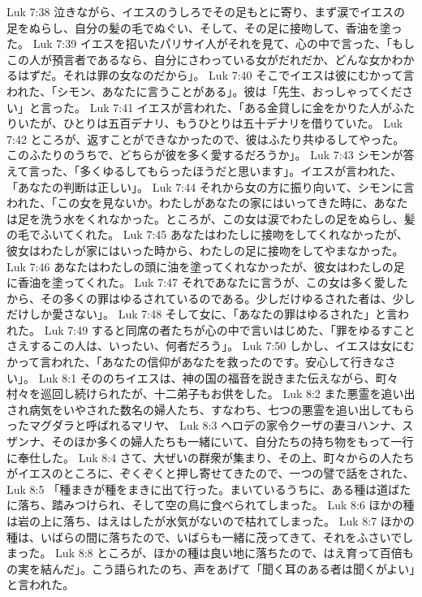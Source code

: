 Luk 7:38  泣きながら、イエスのうしろでその足もとに寄り、まず涙でイエスの足をぬらし、自分の髪の毛でぬぐい、そして、その足に接吻して、香油を塗った。
Luk 7:39  イエスを招いたパリサイ人がそれを見て、心の中で言った、「もしこの人が預言者であるなら、自分にさわっている女がだれだか、どんな女かわかるはずだ。それは罪の女なのだから」。
Luk 7:40  そこでイエスは彼にむかって言われた、「シモン、あなたに言うことがある」。彼は「先生、おっしゃってください」と言った。
Luk 7:41  イエスが言われた、「ある金貸しに金をかりた人がふたりいたが、ひとりは五百デナリ、もうひとりは五十デナリを借りていた。
Luk 7:42  ところが、返すことができなかったので、彼はふたり共ゆるしてやった。このふたりのうちで、どちらが彼を多く愛するだろうか」。
Luk 7:43  シモンが答えて言った、「多くゆるしてもらったほうだと思います」。イエスが言われた、「あなたの判断は正しい」。
Luk 7:44  それから女の方に振り向いて、シモンに言われた、「この女を見ないか。わたしがあなたの家にはいってきた時に、あなたは足を洗う水をくれなかった。ところが、この女は涙でわたしの足をぬらし、髪の毛でふいてくれた。
Luk 7:45  あなたはわたしに接吻をしてくれなかったが、彼女はわたしが家にはいった時から、わたしの足に接吻をしてやまなかった。
Luk 7:46  あなたはわたしの頭に油を塗ってくれなかったが、彼女はわたしの足に香油を塗ってくれた。
Luk 7:47  それであなたに言うが、この女は多く愛したから、その多くの罪はゆるされているのである。少しだけゆるされた者は、少しだけしか愛さない」。
Luk 7:48  そして女に、「あなたの罪はゆるされた」と言われた。
Luk 7:49  すると同席の者たちが心の中で言いはじめた、「罪をゆるすことさえするこの人は、いったい、何者だろう」。
Luk 7:50  しかし、イエスは女にむかって言われた、「あなたの信仰があなたを救ったのです。安心して行きなさい」。
Luk 8:1  そののちイエスは、神の国の福音を説きまた伝えながら、町々村々を巡回し続けられたが、十二弟子もお供をした。
Luk 8:2  また悪霊を追い出され病気をいやされた数名の婦人たち、すなわち、七つの悪霊を追い出してもらったマグダラと呼ばれるマリヤ、
Luk 8:3  ヘロデの家令クーザの妻ヨハンナ、スザンナ、そのほか多くの婦人たちも一緒にいて、自分たちの持ち物をもって一行に奉仕した。
Luk 8:4  さて、大ぜいの群衆が集まり、その上、町々からの人たちがイエスのところに、ぞくぞくと押し寄せてきたので、一つの譬で話をされた、
Luk 8:5  「種まきが種をまきに出て行った。まいているうちに、ある種は道ばたに落ち、踏みつけられ、そして空の鳥に食べられてしまった。
Luk 8:6  ほかの種は岩の上に落ち、はえはしたが水気がないので枯れてしまった。
Luk 8:7  ほかの種は、いばらの間に落ちたので、いばらも一緒に茂ってきて、それをふさいでしまった。
Luk 8:8  ところが、ほかの種は良い地に落ちたので、はえ育って百倍もの実を結んだ」。こう語られたのち、声をあげて「聞く耳のある者は聞くがよい」と言われた。
